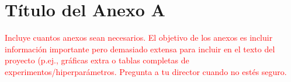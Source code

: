 \documentclass[12pt]{extarticle}
\numberwithin{equation}{section}
\begin{document}
\printbibliography[heading=none]

\newpage

\appendix
\section{T\'itulo del Anexo A}
\textcolor{red}{Incluye cuantos anexos sean necesarios. El objetivo de los anexos es incluir informaci\'on importante pero demasiado extensa para incluir en el texto del proyecto (p.ej., gr\'aficas extra o tablas completas de experimentos/hiperpar\'ametros. Pregunta a tu director cuando no est\'es seguro.}
\end{document}
